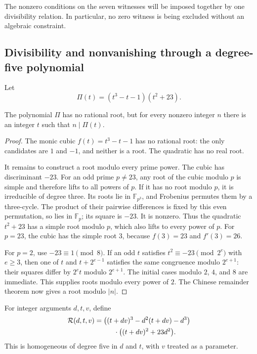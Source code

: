 The nonzero conditions on the seven witnesses will be imposed together
by one divisibility relation. In particular, no zero witness is being
excluded without an algebraic constraint.

\subsection{Divisibility and nonvanishing through a degree-five polynomial}

Let
\[
 \Pi(t)=(t^3-t-1)(t^2+23).
\]

\begin{lemma}[Intersectivity]
\label{i17:intersective}
The polynomial $\Pi$ has no rational root, but for every nonzero
integer $n$ there is an integer $t$ such that $n\mid\Pi(t)$.
\end{lemma}
\begin{proof}
The monic cubic $f(t)=t^3-t-1$ has no rational root: the only candidates
are $1$ and $-1$, and neither is a root. The quadratic has no real root.

It remains to construct a root modulo every prime power. The cubic has
discriminant $-23$. For an odd prime $p\ne23$, any root of the cubic
modulo $p$ is simple and therefore lifts to all powers of $p$.
If it has no root modulo $p$, it is irreducible of degree three.
Its roots lie in $\mathbb F_{p^3}$, and Frobenius permutes them by a
three-cycle. The product of their pairwise differences is fixed by this
even permutation, so lies in $\mathbb F_p$; its square is $-23$.
It is nonzero. Thus the quadratic $t^2+23$ has a simple root modulo
$p$, which also lifts to every power of $p$.
For $p=23$, the cubic has the simple root $3$, because
$f(3)=23$ and $f'(3)=26$.

For $p=2$, use $-23\equiv1\pmod8$.
If an odd $t$ satisfies $t^2\equiv-23\pmod{2^e}$ with $e\ge3$,
then one of $t$ and $t+2^{e-1}$ satisfies the same congruence modulo
$2^{e+1}$: their squares differ by $2^et$ modulo $2^{e+1}$.
The initial cases modulo $2$, $4$, and $8$ are immediate. This supplies
roots modulo every power of $2$. The Chinese remainder theorem now
gives a root modulo $|n|$.
\end{proof}

For integer arguments $d,t,v$, define
\begin{equation}
 \begin{aligned}
 \mathcal R(d,t,v)={}&
 \bigl((t+dv)^3-d^2(t+dv)-d^3\bigr)\\
 &\hspace{1.5em}\cdot\bigl((t+dv)^2+23d^2\bigr).
 \end{aligned}
 \label{i17:homogeneous}
\end{equation}
This is homogeneous of degree five in $d$ and $t$, with $v$ treated
as a parameter.

